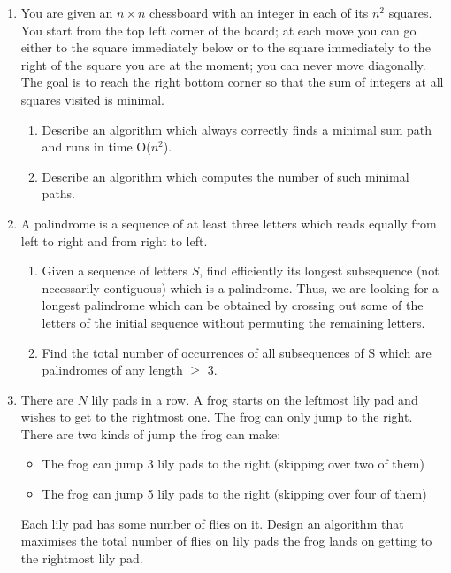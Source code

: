 \documentclass[a4paper]{article}
\begin{document}
\begin{enumerate}
				\item You are given an $n\times n$ chessboard with an integer in each of its $n^2$ squares. You start from the top left corner of the board; at each move you can go either to the square immediately below or to the square immediately to the right of the square you are at the moment; you can never move diagonally. The goal is to reach the right bottom corner so that the sum of integers at all squares visited is minimal.
						\begin{enumerate}
								\item Describe an algorithm which always correctly finds a minimal sum path and runs in time O($n^2$).
								\item Describe an algorithm which computes the number of such minimal paths.
						\end{enumerate}

				\item A palindrome is a sequence of at least three letters which reads equally from left to right and from right to left.

						\begin{enumerate}
								\item Given a sequence of letters $S$, find efficiently its longest subsequence (not necessarily contiguous) which is a palindrome. Thus, we are looking for a longest palindrome which can be obtained by crossing out some of the letters of the initial sequence without permuting the remaining letters.

								\item Find the total number of occurrences of all subsequences of S which are palindromes of any length $\geq$ 3.
						\end{enumerate}

				\item There are $N$ lily pads in a row. A frog starts on the leftmost lily pad and wishes to get to the rightmost one. The frog can only jump to the right. There are two kinds of jump the frog can make:
						\begin{itemize}
								\item The frog can jump 3 lily pads to the right (skipping over two of them)
								\item The frog can jump 5 lily pads to the right (skipping over four of them)
						\end{itemize} 
				Each lily pad has some number of flies on it. Design an algorithm that maximises the total number of flies on lily pads the frog lands on getting to the rightmost lily pad.


\end{enumerate}
\end{document}
